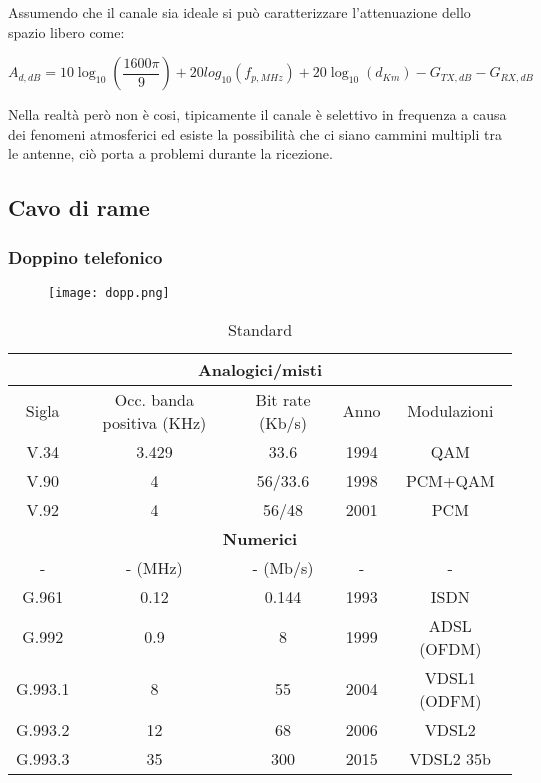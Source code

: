 \documentclass{article}
\begin{document}
\begin{enumerate}
        Assumendo che il canale sia ideale si può caratterizzare l'attenuazione dello spazio libero come:

        $$A_{d,dB}=10\log_{10}\left(\frac{1600\pi}{9}\right)+20log_{10}(f_{p,MHz})+20\log_{10}(d_{Km})-G_{TX,dB}-G_{RX,dB}$$

        Nella realtà però non è cosi, tipicamente il canale è selettivo in frequenza a causa dei fenomeni atmosferici ed esiste la possibilità che ci siano cammini multipli tra le antenne, ciò porta a problemi durante la ricezione.
    
\end{enumerate}

\newpage

\subsection{Cavo di rame}

\subsubsection{Doppino telefonico}

\begin{figure}[ht]
    \centering
    \texttt{[image: dopp.png]}
\end{figure}


\begin{table}[ht]
    \centering
    \begin{tabular}{|c|c|c|c|c|}
        \hline
        \multicolumn{5}{|c|}{\textbf{Analogici/misti}}\\
        \hline
        Sigla & Occ. banda positiva (KHz) & Bit rate (Kb/s) & Anno & Modulazioni\\
        \hline
        V.34 & 3.429 & 33.6 & 1994 & QAM\\
        \hline
        V.90 & 4 & 56/33.6 & 1998 & PCM+QAM\\
        \hline
        V.92 & 4 & 56/48 & 2001 & PCM\\
         \hline
        \multicolumn{5}{|c|}{\textbf{Numerici}}\\
        \hline
        - & - (MHz) & - (Mb/s) & - & -\\
        \hline
        G.961 & 0.12 & 0.144 & 1993 & ISDN\\
        \hline
        G.992 & 0.9 & 8 & 1999 & ADSL (OFDM)\\
        \hline
        G.993.1 & 8 & 55 & 2004 & VDSL1 (ODFM)\\
        \hline
        G.993.2 & 12 & 68 & 2006 & VDSL2\\
        \hline
        G.993.3 & 35 & 300 & 2015 & VDSL2 35b\\
        \hline
    \end{tabular}
    \caption{Standard}
\end{table}
\end{document}
